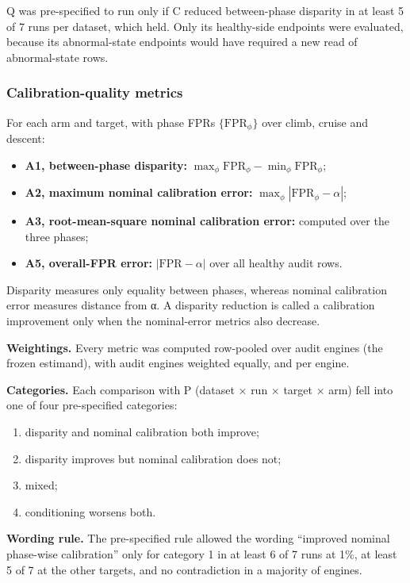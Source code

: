 \documentclass[preprint,11pt,a4paper]{elsarticle}
\begin{document}
Q was pre-specified to run only if C reduced between-phase disparity in at least 5 of 7 runs per dataset, which held. Only its healthy-side endpoints were evaluated, because its abnormal-state endpoints would have required a new read of abnormal-state rows.

\subsubsection{Calibration-quality metrics}

For each arm and target, with phase FPRs $\{\mathrm{FPR}_\phi\}$ over climb, cruise and descent:
\begin{itemize}
\item \textbf{A1, between-phase disparity:} $\max_\phi \mathrm{FPR}_\phi - \min_\phi \mathrm{FPR}_\phi$;
\item \textbf{A2, maximum nominal calibration error:} $\max_\phi |\mathrm{FPR}_\phi - \alpha|$;
\item \textbf{A3, root-mean-square nominal calibration error:} computed over the three phases;
\item \textbf{A5, overall-FPR error:} $|\mathrm{FPR} - \alpha|$ over all healthy audit rows.
\end{itemize}

Disparity measures only equality between phases, whereas nominal calibration error measures distance from α. A disparity reduction is called a calibration improvement only when the nominal-error metrics also decrease.

\textbf{Weightings.} Every metric was computed row-pooled over audit engines (the frozen estimand), with audit engines weighted equally, and per engine.

\textbf{Categories.} Each comparison with P (dataset × run × target × arm) fell into one of four pre-specified categories:
\begin{enumerate}
\item disparity and nominal calibration both improve;
\item disparity improves but nominal calibration does not;
\item mixed;
\item conditioning worsens both.
\end{enumerate}

\textbf{Wording rule.} The pre-specified rule allowed the wording ``improved nominal phase-wise calibration'' only for category 1 in at least 6 of 7 runs at 1\%, at least 5 of 7 at the other targets, and no contradiction in a majority of engines.
\end{document}
